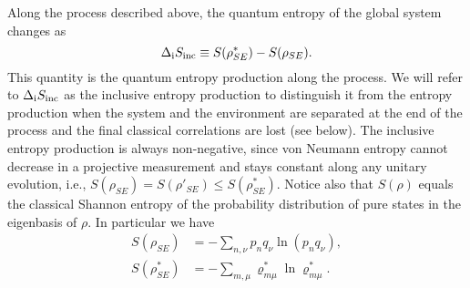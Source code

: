 \documentclass[aps,prx,twocolumn,showpacs,floatfix,superscriptaddress,graphics,longbibliography]{revtex4-1}
\begin{document}
Along the process described above, the quantum entropy of the global system changes as
\begin{equation} \label{sprod1}
\Delta_{\rm i} S_{\rm inc} \equiv S(\rho_{SE}^\ast) - S(\rho_{SE}).
\end{equation}
This quantity is the quantum entropy production along the process. We will refer to  $\Delta_{\rm i} S_{\rm inc}$ as the inclusive entropy production to distinguish it from the entropy production 
when the system and the environment are separated at the end of the process and the final classical correlations are lost (see below). 
The inclusive entropy production is always non-negative, since von Neumann entropy cannot decrease in a projective measurement and stays constant along any unitary evolution, i.e., $S(\rho_{SE}) = S(\rho'_{SE}) \leq S(\rho^\ast_{SE})$.
Notice also that $S(\rho)$ equals the classical Shannon entropy of the probability distribution of pure states in the eigenbasis of $\rho$. In particular we have
\begin{align}
S(\rho_{SE}) & = -\sum_{n,\nu} p_n q_\nu \ln (p_n q_\nu),  \\  
S(\rho_{SE}^\ast) & = -\sum_{m,\mu} \varrho^\ast_{m\mu}\ln \varrho^\ast_{m\mu}. 
\end{align}
\end{document}
